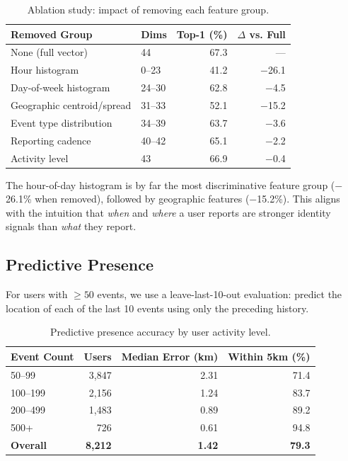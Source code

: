 \documentclass[11pt,a4paper]{article}
\begin{document}
\begin{table}[ht]
\centering
\caption{Ablation study: impact of removing each feature group.}
\label{tab:ablation}
\begin{tabular}{llrr}
\toprule
\textbf{Removed Group} & \textbf{Dims} & \textbf{Top-1 (\%)} & \textbf{$\Delta$ vs. Full} \\
\midrule
None (full vector)        & 44     & 67.3 & --- \\
Hour histogram            & 0--23  & 41.2 & $-$26.1 \\
Day-of-week histogram     & 24--30 & 62.8 & $-$4.5 \\
Geographic centroid/spread & 31--33 & 52.1 & $-$15.2 \\
Event type distribution   & 34--39 & 63.7 & $-$3.6 \\
Reporting cadence         & 40--42 & 65.1 & $-$2.2 \\
Activity level            & 43     & 66.9 & $-$0.4 \\
\bottomrule
\end{tabular}
\end{table}

The hour-of-day histogram is by far the most discriminative feature group ($-$26.1\% when removed), followed by geographic features ($-$15.2\%). This aligns with the intuition that \emph{when} and \emph{where} a user reports are stronger identity signals than \emph{what} they report.

\subsection{Predictive Presence}
\label{sec:exp_prediction}

For users with $\geq 50$ events, we use a leave-last-10-out evaluation: predict the location of each of the last 10 events using only the preceding history.

\begin{table}[ht]
\centering
\caption{Predictive presence accuracy by user activity level.}
\label{tab:prediction}
\begin{tabular}{lrrr}
\toprule
\textbf{Event Count} & \textbf{Users} & \textbf{Median Error (km)} & \textbf{Within 5km (\%)} \\
\midrule
50--99    & 3,847 & 2.31 & 71.4 \\
100--199  & 2,156 & 1.24 & 83.7 \\
200--499  & 1,483 & 0.89 & 89.2 \\
500+      &   726 & 0.61 & 94.8 \\
\midrule
\textbf{Overall} & \textbf{8,212} & \textbf{1.42} & \textbf{79.3} \\
\bottomrule
\end{tabular}
\end{table}
\end{document}

